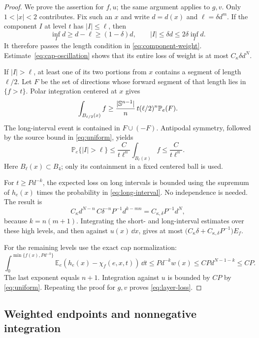 \begin{proof}
We prove the assertion for $f,u$; the same argument applies to $g,v$.
Only $1<|x|<2$ contributes.  Fix such an $x$ and write $d=d(x)$
and $\ell=\delta d^m$.
If the component $I$ at level $t$ has $|I|\le\ell$, then
\[
 \inf_I d\ge d-\ell\ge(1-\delta)d,
 \qquad |I|\le\delta d\le2\delta\inf_I d.
\]
It therefore passes the length condition in
\eqref{eq:component-weight}.  Estimate~\eqref{eq:cap-oscillation}
shows that its entire loss of weight is at most
$C_\kappa\delta d^N$.

If $|I|>\ell$, at least one of its two portions from $x$ contains
a segment of length $\ell/2$.  Let $F$ be the set of directions
whose forward segment of that length lies in $\{f>t\}$.  Polar
integration centered at $x$ gives
\[
 \int_{B_{\ell/2}(x)}f
 \ge \frac{|\mathbb S^{n-1}|}{n}\,t(\ell/2)^n\mathbb P_e(F).
\]
The long-interval event is contained in $F\cup(-F)$.  Antipodal
symmetry, followed by the source bound in \eqref{eq:uniform}, yields
\begin{equation}\label{eq:long-interval}
 \mathbb P_e\{|I|>\ell\}
 \le \frac{C}{t\ell^n}\int_{B_\ell(x)}f
 \le\frac{C}{t\ell^n}.
\end{equation}
Here $B_\ell(x)\subset B_4$; only its containment in a fixed
centered ball is used.

For $t\ge P d^{-k}$, the expected loss on long intervals is bounded
using the supremum of $h_e(x)$ times the probability in
\eqref{eq:long-interval}.  No independence is needed.  The result is
\[
 C_\kappa d^{N-n}\,C\delta^{-n}P^{-1}d^{k-mn}
   =C_{\kappa,\delta}P^{-1}d^N,
\]
because $k=n(m+1)$.  Integrating the short- and long-interval
estimates over these high levels, and then against $u(x)\,\dd x$,
gives at most
$\bigl(C_\kappa\delta+C_{\kappa,\delta}P^{-1}\bigr)E_f$.

For the remaining levels use the exact cap normalization:
\[
 \int_0^{\min\{f(x),Pd^{-k}\}}
        \mathbb E_e(h_e(x)-\chi_f(e,x,t))\,\dd t
 \le Pd^{-k}w(x)\le CPd^{N-1-k}\le CP.
\]
The last exponent equals $n+1$.  Integration against $u$ is bounded
by $CP$ by \eqref{eq:uniform}.  Repeating the proof for $g,v$
proves \eqref{eq:layer-loss}.
\end{proof}

\subsection{Weighted endpoints and nonnegative integration}

